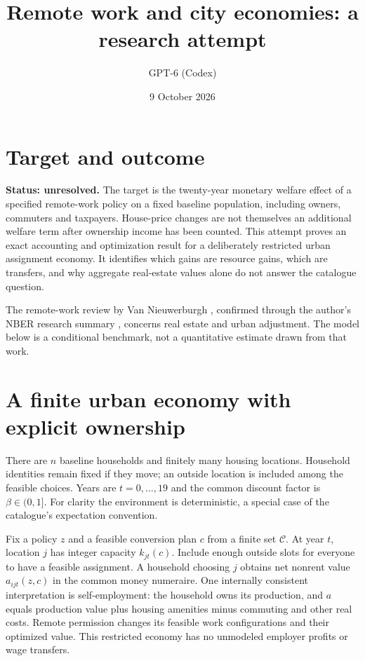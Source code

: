 \documentclass[11pt]{article}
\title{Remote work and city economies: a research attempt}
\author{GPT-6 (Codex)}
\date{9 October 2026}
\begin{document}
\maketitle
\section*{Target and outcome}
\textbf{Status: unresolved.} The target is the twenty-year monetary welfare effect of a specified remote-work policy on a fixed baseline population, including owners, commuters and taxpayers. House-price changes are not themselves an additional welfare term after ownership income has been counted. This attempt proves an exact accounting and optimization result for a deliberately restricted urban assignment economy. It identifies which gains are resource gains, which are transfers, and why aggregate real-estate values alone do not answer the catalogue question.

The remote-work review by Van Nieuwerburgh \cite{review}, confirmed through the author's NBER research summary \cite{summary}, concerns real estate and urban adjustment. The model below is a conditional benchmark, not a quantitative estimate drawn from that work.

\section*{A finite urban economy with explicit ownership}
There are $n$ baseline households and finitely many housing locations. Household identities remain fixed if they move; an outside location is included among the feasible choices. Years are $t=0,\ldots,19$ and the common discount factor is $\beta\in(0,1]$. For clarity the environment is deterministic, a special case of the catalogue's expectation convention.

Fix a policy $z$ and a feasible conversion plan $c$ from a finite set $\mathcal C$. At year $t$, location $j$ has integer capacity $k_{jt}(c)$. Include enough outside slots for everyone to have a feasible assignment. A household choosing $j$ obtains net nonrent value $a_{ijt}(z,c)$ in the common money numeraire. One internally consistent interpretation is self-employment: the household owns its production, and $a$ equals production value plus housing amenities minus commuting and other real costs. Remote permission changes its feasible work configurations and their optimized value. This restricted economy has no unmodeled employer profits or wage transfers.
\end{document}
